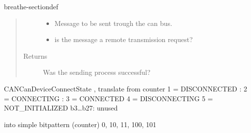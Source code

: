 \documentclass[a4paper,10pt,english]{sphinxmanual}
\begin{document}
\begin{fulllineitems}
\begin{sphinxuseclass}{breathe-sectiondef}
\begin{fulllineitems}
\begin{quote}
\begin{description}
\begin{itemize}
\item {} 
\sphinxAtStartPar
{} \textendash{} Message to be sent trough the can bus. 

\item {} 
\sphinxAtStartPar
{} \textendash{} is the message a remote transmission request? 

\end{itemize}

\item[{Returns}] \leavevmode
\sphinxAtStartPar
Was the sending process successful? 

\end{description}\end{quote}

\end{fulllineitems}


\begin{fulllineitems}
\label{\detokenize{classestracing:_CPPv4N10AnaCanScan13getPortStatusEv}}%
\pysigstartmultiline
{}%
\pysigstopmultiline
\sphinxAtStartPar
CANCanDeviceConnectState , translate from counter 1 = DISCONNECTED : 2 = CONNECTING : 3 = CONNECTED 4 = DISCONNECTING 5 = NOT\_INITIALIZED b3…b27: unused

\sphinxAtStartPar
into simple bitpattern (counter) 0, 10, 11, 100, 101 

\end{fulllineitems}


\end{sphinxuseclass}
\end{fulllineitems}

\end{document}
